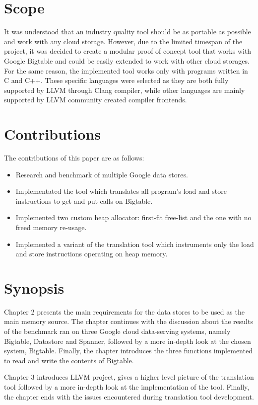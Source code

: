 \documentclass[bsc,frontabs,twoside,singlespacing,parskip,deptreport]{infthesis}     %
\begin{document}
\section{Scope}

It was understood that an industry quality tool should be as portable as possible and work with any cloud storage. However, due to the limited timespan of the project, it was decided to create a modular proof of concept tool that works with Google Bigtable and could be easily extended to work with other cloud storages. For the same reason, the implemented tool works only with programs written in C and C++. These specific languages were selected as they are both fully supported by LLVM through Clang compiler, while other languages are mainly supported by LLVM community created compiler frontends.

\section{Contributions}

The contributions of this paper are as follows:
\begin{itemize}
\item
Research and benchmark of multiple Google data stores.
\item
Implementated the tool which translates all program's load and store instructions to get and put calls on Bigtable.
\item
Implemented two custom heap allocator: first-fit free-list and the one with no freed memory re-usage.
\item
Implemented a variant of the translation tool which instruments only the load and store instructions operating on heap memory.
\end{itemize}

\section{Synopsis}

Chapter 2 presents the main requirements for the data stores to be used as the main memory source. The chapter continues with the discussion about the results of the benchmark ran on three Google cloud data-serving systems, namely Bigtable, Datastore and Spanner, followed by a more in-depth look at the chosen system, Bigtable. Finally, the chapter introduces the three functions implemented to read and write the contents of Bigtable.

Chapter 3 introduces LLVM project, gives a higher level picture of the translation tool followed by a more in-depth look at the implementation of the tool. Finally, the chapter ends with the issues encountered during translation tool development.
\end{document}
